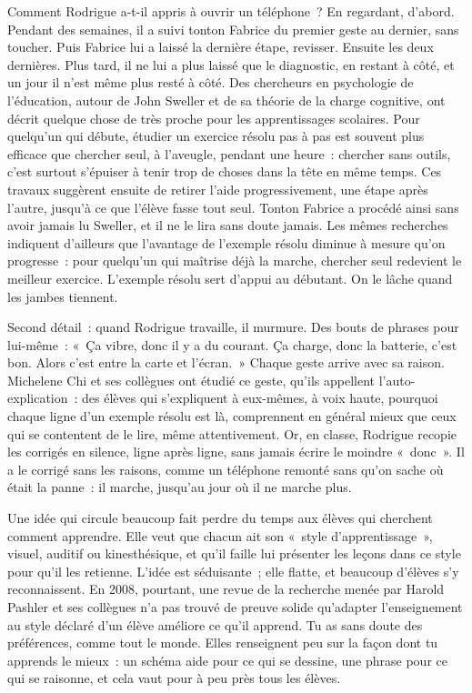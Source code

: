 \documentclass[10.5pt,twoside,openright]{book}
\begin{document}
Comment Rodrigue a-t-il appris à ouvrir un téléphone ? En regardant, d’abord. Pendant des semaines, il a suivi tonton Fabrice du premier geste au dernier, sans toucher. Puis Fabrice lui a laissé la dernière étape, revisser. Ensuite les deux dernières. Plus tard, il ne lui a plus laissé que le diagnostic, en restant à côté, et un jour il n’est même plus resté à côté. Des chercheurs en psychologie de l’éducation, autour de John Sweller et de sa théorie de la charge cognitive, ont décrit quelque chose de très proche pour les apprentissages scolaires. Pour quelqu’un qui débute, étudier un exercice résolu pas à pas est souvent plus efficace que chercher seul, à l’aveugle, pendant une heure : chercher sans outils, c’est surtout s’épuiser à tenir trop de choses dans la tête en même temps. Ces travaux suggèrent ensuite de retirer l’aide progressivement, une étape après l’autre, jusqu’à ce que l’élève fasse tout seul. Tonton Fabrice a procédé ainsi sans avoir jamais lu Sweller, et il ne le lira sans doute jamais. Les mêmes recherches indiquent d’ailleurs que l’avantage de l’exemple résolu diminue à mesure qu’on progresse : pour quelqu’un qui maîtrise déjà la marche, chercher seul redevient le meilleur exercice. L’exemple résolu sert d’appui au débutant. On le lâche quand les jambes tiennent.

Second détail : quand Rodrigue travaille, il murmure. Des bouts de phrases pour lui-même : « Ça vibre, donc il y a du courant. Ça charge, donc la batterie, c’est bon. Alors c’est entre la carte et l’écran. » Chaque geste arrive avec sa raison. Michelene Chi et ses collègues ont étudié ce geste, qu’ils appellent l’auto-explication : des élèves qui s’expliquent à eux-mêmes, à voix haute, pourquoi chaque ligne d’un exemple résolu est là, comprennent en général mieux que ceux qui se contentent de le lire, même attentivement. Or, en classe, Rodrigue recopie les corrigés en silence, ligne après ligne, sans jamais écrire le moindre « donc ». Il a le corrigé sans les raisons, comme un téléphone remonté sans qu’on sache où était la panne : il marche, jusqu’au jour où il ne marche plus.

Une idée qui circule beaucoup fait perdre du temps aux élèves qui cherchent comment apprendre. Elle veut que chacun ait son « style d’apprentissage », visuel, auditif ou kinesthésique, et qu’il faille lui présenter les leçons dans ce style pour qu’il les retienne. L’idée est séduisante ; elle flatte, et beaucoup d’élèves s’y reconnaissent. En 2008, pourtant, une revue de la recherche menée par Harold Pashler et ses collègues n’a pas trouvé de preuve solide qu’adapter l’enseignement au style déclaré d’un élève améliore ce qu’il apprend. Tu as sans doute des préférences, comme tout le monde. Elles renseignent peu sur la façon dont tu apprends le mieux : un schéma aide pour ce qui se dessine, une phrase pour ce qui se raisonne, et cela vaut pour à peu près tous les élèves.
\end{document}
